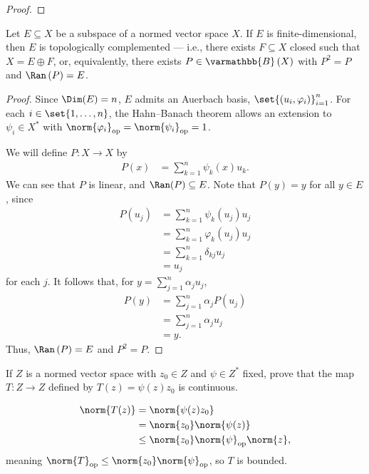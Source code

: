 \documentclass[10pt]{mypackage}
\renewcommand*{\mathbb}[1]{\varmathbb{#1}}
\newcommand{\B}{\mathbb{B}}
\begin{document}
\begin{proof}
\end{proof}
\begin{proposition}
  Let $E\subseteq X$ be a subspace of a normed vector space $X$. If $E$ is finite-dimensional, then $E$ is topologically complemented --- i.e., there exists $F\subseteq X$ closed such that $X = E\oplus F$, or, equivalently, there exists $P\in \B\left(X\right)$ with $P^2 = P$ and $\Ran\left(P\right) = E$.
\end{proposition}
\begin{proof}
  Since $\Dim(E) = n$, $E$ admits an Auerbach basis, $\set{\left(u_i,\varphi_i\right)}_{i=1}^{n}$. For each $i \in \set{1,\dots,n}$, the Hahn--Banach theorem allows an extension to $\psi_i\in X^{\ast}$ with $\norm{\varphi_i}_{\text{op}} = \norm{\psi_i}_{\text{op}} = 1$.\newline

  We will define $P: X\rightarrow X$ by
  \begin{align*}
    P(x) &= \sum_{k=1}^{n}\psi_k(x)u_k.
  \end{align*}
  We can see that $P$ is linear, and $\Ran(P) \subseteq E$. Note that $P(y) = y$ for all $y\in E$, since
  \begin{align*}
    P\left(u_j\right) &= \sum_{k=1}^{n}\psi_k\left(u_j\right)u_j\\
                      &= \sum_{k=1}^{n}\varphi_k\left(u_j\right)u_j\\
                      &= \sum_{k=1}^{n}\delta_{kj}u_j\\
                      &= u_j
  \end{align*}
  for each $j$. It follows that, for $y = \sum_{j=1}^{n}\alpha_ju_j$,
  \begin{align*}
    P\left(y\right) &= \sum_{j=1}^{n}\alpha_jP\left(u_j\right)\\
                    &= \sum_{j=1}^{n}\alpha_ju_j\\
                    &= y.
  \end{align*}
  Thus, $\Ran\left(P\right) = E$ and $P^2 = P$.
\end{proof}
\begin{exercise}
  If $Z$ is a normed vector space with $z_0\in Z$ and $\psi\in Z^{\ast}$ fixed, prove that the map $T: Z\rightarrow Z$ defined by $T(z) = \psi(z)z_0$ is continuous.
\end{exercise}
\begin{solution}
  \begin{align*}
    \norm{T(z)} &= \norm{\psi(z)z_0}\\
                &= \norm{z_0}\norm{\psi(z)}\\
                &\leq \norm{z_0}\norm{\psi}_{\text{op}}\norm{z},
  \end{align*}
  meaning $\norm{T}_{\text{op}}\leq \norm{z_0}\norm{\psi}_{\text{op}}$, so $T$ is bounded.
\end{solution}
\end{document}
